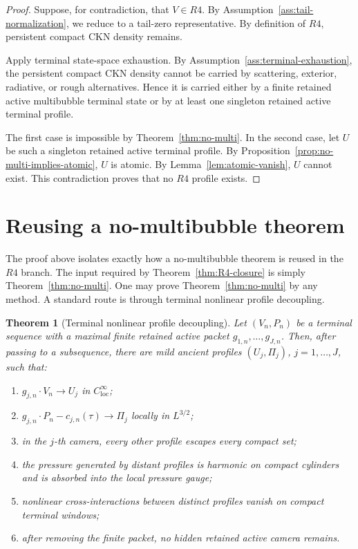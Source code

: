 \documentclass[11pt]{article}
\numberwithin{equation}{section}
\newtheorem{theorem}{Theorem}[section]
\newcommand{\loc}{\mathrm{loc}}
\begin{document}
\begin{proof}
Suppose, for contradiction, that \(V\in R4\).  By
Assumption~\ref{ass:tail-normalization}, we reduce to a tail-zero representative.
By definition of \(R4\), persistent compact CKN density remains.

Apply terminal state-space exhaustion.  By
Assumption~\ref{ass:terminal-exhaustion}, the persistent compact CKN density
cannot be carried by scattering, exterior, radiative, or rough alternatives.
Hence it is carried either by a finite retained active multibubble terminal
state or by at least one singleton retained active terminal profile.

The first case is impossible by Theorem~\ref{thm:no-multi}.  In the second
case, let \(U\) be such a singleton retained active terminal profile.  By
Proposition~\ref{prop:no-multi-implies-atomic}, \(U\) is atomic.  By
Lemma~\ref{lem:atomic-vanish}, \(U\) cannot exist.  This contradiction proves
that no \(R4\) profile exists.
\end{proof}

\section{Reusing a no-multibubble theorem}
\label{sec:reuse}

The proof above isolates exactly how a no-multibubble theorem is reused in the
\(R4\) branch.  The input required by Theorem~\ref{thm:R4-closure} is simply
Theorem~\ref{thm:no-multi}.  One may prove Theorem~\ref{thm:no-multi} by any
method.  A standard route is through terminal nonlinear profile decoupling.

\begin{theorem}[Terminal nonlinear profile decoupling]
\label{thm:terminal-decoupling}
Let \((V_n,P_n)\) be a terminal sequence with a maximal finite retained active
packet \(g_{1,n},\ldots,g_{J,n}\).  Then, after passing to a subsequence, there
are mild ancient profiles \((U_j,\Pi_j)\), \(j=1,\ldots,J\), such that:
\begin{enumerate}[label=(\roman*)]
  \item \(g_{j,n}\cdot V_n\to U_j\) in \(C^\infty_{\loc}\);
  \item \(g_{j,n}\cdot P_n-c_{j,n}(\tau)\to\Pi_j\) locally in \(L^{3/2}\);
  \item in the \(j\)-th camera, every other profile escapes every compact set;
  \item the pressure generated by distant profiles is harmonic on compact
  cylinders and is absorbed into the local pressure gauge;
  \item nonlinear cross-interactions between distinct profiles vanish on
  compact terminal windows;
  \item after removing the finite packet, no hidden retained active camera
  remains.
\end{enumerate}
\end{theorem}
\end{document}
